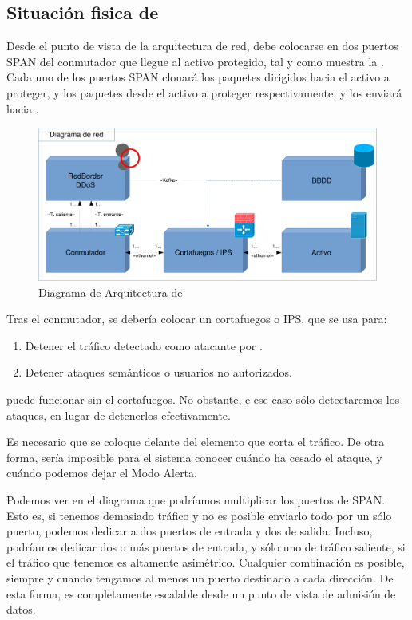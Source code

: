 \subsection{Situación fisica de \redborderddos}
Desde el punto de vista de la arquitectura de red, \redborderddos{} debe colocarse en dos puertos SPAN del conmutador que llegue al activo protegido, tal y como muestra la . Cada uno de los 
puertos SPAN clonará los paquetes dirigidos hacia el activo a proteger, y los paquetes desde el activo a proteger 
respectivamente, y los enviará hacia \redborderddos.

\begin{figure}[htbp]
\centering
\includegraphics[width=\textwidth]{CapituloEstructura/Figuras/DiagramaArquitectura-crop}
\caption{Diagrama de Arquitectura de \redborderddos}
\end{figure}
%

Tras el conmutador, se debería colocar un cortafuegos o \gls{IPS}, que se usa para:
\begin{enumerate}
 \item Detener el tráfico detectado como atacante por \redborderddos.
 \item Detener ataques semánticos o usuarios no autorizados.
\end{enumerate}

\redborderddos{} puede funcionar sin el cortafuegos. No obstante, e ese caso sólo detectaremos los ataques, en lugar de 
detenerlos efectivamente.

Es necesario que \redborderddos{} se coloque delante del elemento que corta el tráfico. De otra forma, sería imposible 
para el sistema conocer cuándo ha cesado el ataque, y cuándo podemos dejar el Modo Alerta.

Podemos ver en el diagrama que podríamos multiplicar los puertos de SPAN. Esto es, si tenemos demasiado tráfico y no es 
posible enviarlo todo por un sólo puerto, podemos dedicar a \redborderddos{} dos puertos de entrada y dos de salida. 
Incluso, podríamos dedicar dos o más puertos de entrada, y sólo uno de tráfico saliente, si el tráfico que tenemos es 
altamente asimétrico. Cualquier combinación es posible, siempre y cuando tengamos al menos un puerto destinado a cada 
dirección. De esta forma, \redborderddos{} es completamente escalable desde un punto de vista de admisión de datos.

